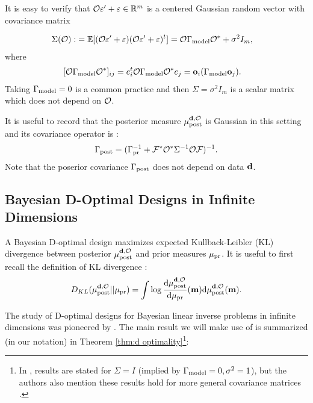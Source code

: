 It is easy to verify that $\mathcal{O} \varepsilon' + \varepsilon \in \mathbb{R}^m$ is a centered
Gaussian random vector with covariance matrix

\begin{align}\label{eq:Sigma}
  \begin{split}
    \Sigma(\obs) :&= \mathbb{E}[ (\obs \eps' + \eps) (\obs \eps' +
      \eps)^t ]
    = \obs \modcov \obs^* + \sigma^2I_m , 
  \end{split}
\end{align}
where
\begin{align}\label{eq:modcov explained}
  \begin{split}
    [\obs \modcov \obs^*]_{ij} & = e_i^t \obs \modcov \obs^* e_j 
    = \meas_i (\modcov \meas_j).%
  \end{split}
\end{align}
Taking $\Gamma_{\textup{model}} = 0$ is a common practice
\cite{tarantola2005,Kaipio2005,Vogel02} and then $\Sigma =
\sigma^2I_m$ is a scalar matrix which does not depend on $\mathcal{O}$.

It is useful to record that the posterior measure $\mu_{\textup{post}}^{\mathbf{d}, \mathcal{O}}$ is Gaussian
in this setting and its covariance operator is \cite{Stuart10}:
\begin{align}\label{eq:postcov}
  \postcov = (\prcov^{-1} + \fwd^* \obs^* \Sigma^{-1} \obs \fwd
  )^{-1}.
\end{align}
Note that the poserior covariance $\Gamma_{\textup{post}}$ does not depend on data
$\mathbf{d}$.

\subsection{Bayesian D-Optimal Designs in Infinite Dimensions}\label{subsec:D optimal design} 
A Bayesian D-optimal design maximizes expected Kullback-Leibler (KL)
divergence between posterior $\mu_{\textup{post}}^{\mathbf{d}, \mathcal{O}}$ and prior measures $\mu_{\textup{pr}}$. It is
useful to first recall the definition of KL divergence \cite{CoverThomas91}:
$$
D_{KL}(\mu_{\textup{post}}^{\mathbf{d}, \mathcal{O}}||\mu_{\textup{pr}}) = \int \log \frac{\text{\textup{d}} \mu_{\textup{post}}^{\mathbf{d}, \mathcal{O}}}{\text{\textup{d}} \mu_{\textup{pr}}}(\mathbf{m}) \text{\textup{d}} \mu_{\textup{post}}^{\mathbf{d}, \mathcal{O}}(\mathbf{m}).
$$

The study of D-optimal designs for Bayesian linear inverse problems in
infinite dimensions was pioneered by \cite{AlexanderianGloorGhattas14,
  alexanderian2018efficient}. The main result we will make use of is
summarized (in our notation) in Theorem \ref{thm:d optimality}\footnote{In
\cite{AlexanderianGloorGhattas14, alexanderian2018efficient}, results
are stated for $\Sigma=I$ (implied by $\Gamma_{\textup{model}} = 0,\sigma^2=1$), but
the authors also mention these results hold for more general
covariance matrices \cite[p. 681]{AlexanderianGloorGhattas14}.}:

